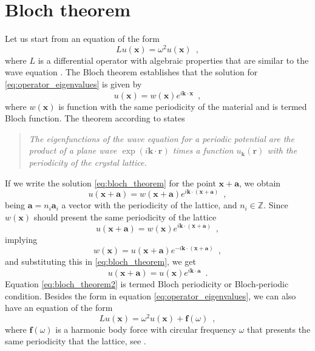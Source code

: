 \section{Bloch theorem}
Let us start from an equation of the form
\begin{equation}
 Lu(\mathbf{x}) = \omega^2 u(\mathbf{x}) \enspace ,
\label{eq:operator_eigenvalues}
\end{equation}
where $L$ is a differential operator with algebraic properties that are similar to the wave equation \cite{algebraic_waves}. The Bloch theorem establishes that the solution for  \eqref{eq:operator_eigenvalues} is given by
%
\begin{equation}
 u(\mathbf{x}) = w(\mathbf{x}) e^{i\mathbf{k}\cdot\mathbf{x}} \enspace ,
\label{eq:bloch_theorem}
\end{equation}
%
where $w(\mathbf{x})$ is function with the same periodicity of the material and is termed Bloch function. The theorem according to \cite{book:kittel1986} states
%
\begin{quote}
\emph{The eigenfunctions of the wave equation for a periodic potential are the product of a plane wave $\exp(i\mathbf{k}\cdot\mathbf{r})$ times a function $u_\mathbf{k}(\mathbf{r})$ with the periodicity of the crystal lattice.}
\end{quote}
%
If we write the solution \eqref{eq:bloch_theorem} for the point $\mathbf{x}+\mathbf{a}$, we obtain
\[
u(\mathbf{x} + \mathbf{a}) = w(\mathbf{x} + \mathbf{a}) e^{i\mathbf{k}\cdot(\mathbf{x} + \mathbf{a})} \enspace ,
\]
being $\mathbf{a} = n_i \mathbf{a}_i$ a vector with the periodicity of the lattice, and  $n_i \in \mathbb{Z}$. Since$w(\mathbf{x})$ should present the same periodicity of the lattice
\[
u(\mathbf{x} + \mathbf{a}) = w(\mathbf{x}) e^{i\mathbf{k}\cdot(\mathbf{x} + \mathbf{a})} \enspace ,
\]
implying
\[
w(\mathbf{x}) = u(\mathbf{x}+ \mathbf{a}) e^{-i\mathbf{k}\cdot(\mathbf{x} + \mathbf{a})} \enspace ,
\]
and substituting this in \eqref{eq:bloch_theorem}, we get
\begin{equation}
u(\mathbf{x} + \mathbf{a}) = u(\mathbf{x}) e^{i\mathbf{k}\cdot\mathbf{a}} \enspace .
\label{eq:bloch_theorem2}
\end{equation}
Equation \eqref{eq:bloch_theorem2} is termed Bloch periodicity or Bloch-periodic condition. Besides the form in equation \eqref{eq:operator_eigenvalues}, we can also have an equation of the form
\begin{equation}
 Lu(\mathbf{x}) = \omega^2 u(\mathbf{x})  + \mathbf{f}(\omega) \enspace ,
\end{equation}
where $\mathbf{f}(\omega)$ is a harmonic body force with circular frequency $\omega$ that presents the same periodicity that the lattice, see \cite{langlet-thesis}.

